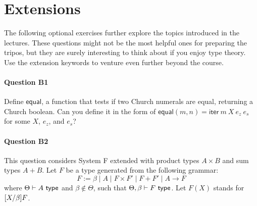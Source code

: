 \documentclass[11pt,a4paper,twoside]{article}
\begin{document}
\section*{Extensions}

The following optional exercises further explore the topics
introduced in the lectures. These questions might not be the most
helpful ones for preparing the tripos, but they are surely
interesting to think about if you enjoy type theory. Use the
extension keywords to venture even further beyond the course.

\paragraph{Question B1} Define $\mathsf{equal}$, a function that
tests if two Church numerals are equal, returning a Church boolean.
Can you define it in the form of $\mathsf{equal}(m, n) =
\mathsf{iter}\ m\ X\ e_z\ e_s$ for some $X$, $e_z$, and $e_s$?




\paragraph{Question B2} This question considers System F extended
with product types $A \times B$ and sum types $A + B$.
Let $F$ be a type generated from the following grammar:
\[
  F := \beta \mid A \mid F \times F' \mid F + F' \mid A \to F
\]
where $\Theta \vdash A\ \mathsf{type}$ and $\beta \notin \Theta$,
such that $\Theta, \beta \vdash F\ \type$.
Let $F(X)$ stands for $[X / \beta] F$.
\end{document}
